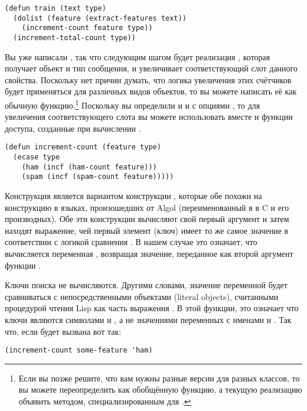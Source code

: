 \begin{lstlisting}
(defun train (text type)
  (dolist (feature (extract-features text))
    (increment-count feature type))
  (increment-total-count type))
\end{lstlisting}

Вы уже написали , так что следующим шагом будет реализация
, которая получает объект  и тип сообщения, и
увеличивает соответствующий слот данного свойства.  Поскольку нет причин думать, что
логика увеличения этих счётчиков будет применяться для различных видов объектов, то вы
можете написать её как обычную функцию.\footnote{Если вы позже решите, что вам нужны
  разные версии  для разных классов, то вы можете переопределить
   как обобщённую функцию, а текущую реализацию объявить методом,
  специализированным для .}  Поскольку вы определили и 
и  с опциями , то для увеличения соответствующего слота
вы можете использовать вместе  и функции доступа, созданные при вычислении
.

\begin{lstlisting}
(defun increment-count (feature type)
  (ecase type
    (ham (incf (ham-count feature)))
    (spam (incf (spam-count feature)))))
\end{lstlisting}

Конструкция  является вариантом конструкции , которые обе похожи на
конструкцию  в языках, произошедших от Algol (переименованный в  в
C и его производных).  Обе эти конструкции вычисляют свой первый аргумент и затем находят
выражение, чей первый элемент (ключ) имеет то же самое значение в соответствии с логикой
сравнения .  В нашем случае это означает, что вычисляется переменная
, возвращая значение, переданное как второй аргумент функции
.

Ключи поиска не вычисляются.  Другими словами, значение переменной  будет
сравниваться с непосредственными объектами (literal objects), считанными процедурой чтения
Lisp как часть выражения . В этой функции, это означает что ключи являются
символами  и , а не значениями переменных с именами  и
.  Так что, если  будет вызвана вот так:

\begin{lstlisting}
(increment-count some-feature 'ham)
\end{lstlisting}

